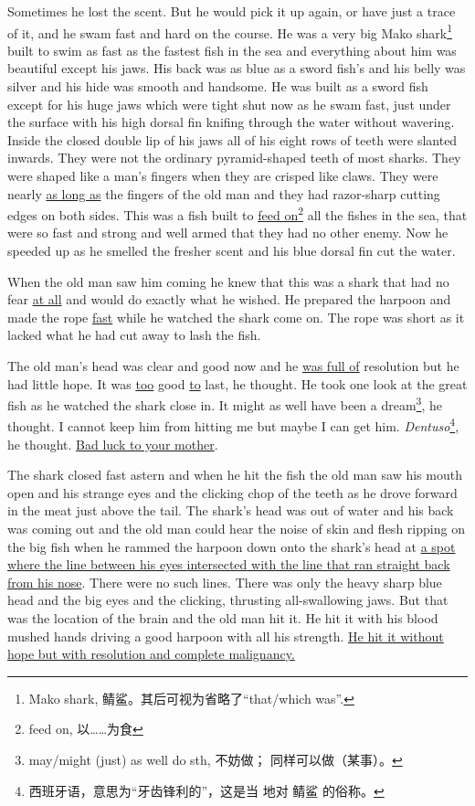 Sometimes he lost the scent. But he would pick it up again, or have just a
\gls{trace} of it, and he swam fast and hard on the course. He was a very
big Mako shark\footnote{Mako shark, 鲭鲨。其后可视为省略了``that/which
  was''.} built to swim as fast as the fastest fish in the sea and
everything about him was beautiful except his jaws. His back was as blue as
a sword fish's and his belly was silver and his hide was smooth and
handsome. He was built as a sword fish except for his huge jaws which were
tight shut now as he swam fast, just under the surface with his high dorsal
fin \gls{knifing} through the water without wavering. Inside the closed
double lip of his jaws all of his eight rows of teeth were slanted
\gls{inwards}. They were not the \gls{ordinary} \gls{pyramid}-shaped teeth
of most sharks. They were shaped like a man's fingers when they are
\gls{crisped} like claws. They were nearly \uline{as long as} the fingers of the old
man and they had \gls{razor}-sharp cutting edges on both sides. This was a
fish built to \uline{feed on}\footnote{feed on, 以……为食} all the fishes
in the sea, that were so fast and strong and well armed that they had no
other enemy. Now he speeded up as he smelled the fresher scent and his blue
dorsal fin cut the water.

When the old man saw him coming he knew that this was a shark that had no
fear \uline{at all} and would do exactly what he wished. He prepared the harpoon and
made the rope \uline{fast} while he watched the shark come on. The rope was short as
it lacked what he had cut away to lash the fish.

The old man's head was clear and good now and he \uline{was full of} resolution
but he had little hope. It was \uline{too} good \uline{to} last, he thought. He
took one look at the great fish as he watched the shark close in. It might
as well have been a dream\footnote{may/might (just) as well do sth, 不妨做；
  同样可以做（某事）。}, he thought. I cannot keep him from hitting me but
maybe I can get him. \emph{Dentuso}\footnote{西班牙语，意思为“牙齿锋利的”，这是当
  地对 鲭鲨 的俗称。}, he thought. \uline{Bad luck to your mother}.

The shark closed fast astern and when he hit the fish the old man saw his
mouth open and his strange eyes and the clicking chop of the teeth as he
drove forward in the meat just above the tail. The shark's head was out of
water and his back was coming out and the old man could hear the noise of
skin and flesh \gls{ripping} on the big fish when he \gls{rammed} the
harpoon down onto the shark's head at \uline{a spot where the line between his
  eyes \gls{intersected} with the line that ran straight back from his nose}.
There were no such lines. There was only the heavy sharp blue head and the
big eyes and the clicking, thrusting all-\gls{swallowing} jaws. But
that was the \gls{location} of the brain and the old man hit it. He hit it
with his blood \gls{mushed} hands driving a good harpoon with all his
strength. \uline{He hit it without hope but with resolution and complete
\gls{malignancy}.}

